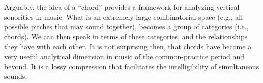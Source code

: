 

Arguably, the idea of a ``chord'' provides a framework for analyzing vertical sonorities in music. What is an extremely large combinatorial space (e.g., all possible pitches that may sound together), becomes a group of categories (i.e., chords). We can then speak in terms of these categories, and the relationships they have with each other. It is not surprising then, that chords have become a very useful analytical dimension in music of the common-practice period and beyond. It is a lossy compression that facilitates the intelligibility of simultaneous sounds.

